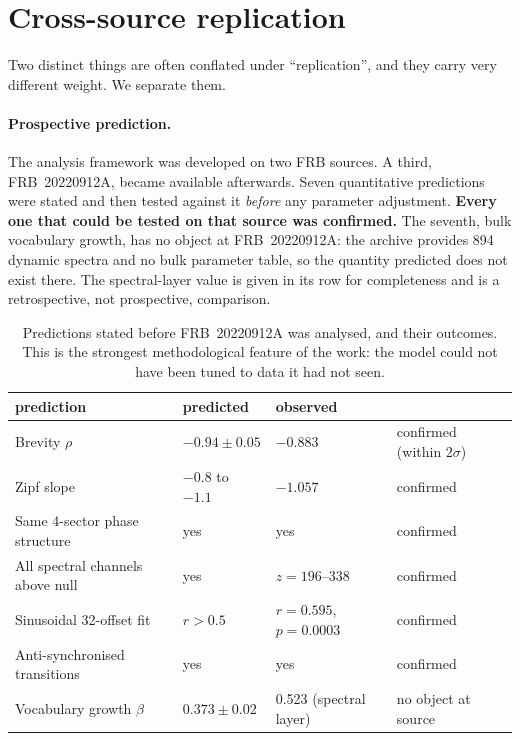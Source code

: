 \documentclass[11pt,a4paper]{article}
\begin{document}
\section{Cross-source replication}

Two distinct things are often conflated under ``replication'', and they carry very
different weight. We separate them.

\paragraph{Prospective prediction.} The analysis framework was developed on two FRB
sources. A third, FRB~20220912A, became available afterwards. Seven quantitative
predictions were stated and then tested against it \emph{before} any parameter
adjustment. \textbf{Every one that could be tested on that source was confirmed.} The
seventh, bulk vocabulary growth, has no object at FRB~20220912A: the archive provides 894
dynamic spectra and no bulk parameter table, so the quantity predicted does not exist
there. The spectral-layer value is given in its row for completeness and is a
retrospective, not prospective, comparison.

\begin{table}[htbp]
\centering
\caption{Predictions stated before FRB~20220912A was analysed, and their outcomes.
This is the strongest methodological feature of the work: the model could not have been
tuned to data it had not seen.}
\label{tab:predictions}
\small
\begin{tabular}{llll}
\toprule
prediction & predicted & observed & \\
\midrule
Brevity $\rho$ & $-0.94 \pm 0.05$ & $-0.883$ & confirmed (within $2\sigma$) \\
Zipf slope & $-0.8$ to $-1.1$ & $-1.057$ & confirmed \\
Same 4-sector phase structure & yes & yes & confirmed \\
All spectral channels above null & yes & $z = 196$--$338$ & confirmed \\
Sinusoidal 32-offset fit & $r > 0.5$ & $r = 0.595$, $p = 0.0003$ & confirmed \\
Anti-synchronised transitions & yes & yes & confirmed \\
Vocabulary growth $\beta$ & $0.373 \pm 0.02$ & 0.523 (spectral layer) & no object at source \\
\bottomrule
\end{tabular}
\end{table}
\end{document}
